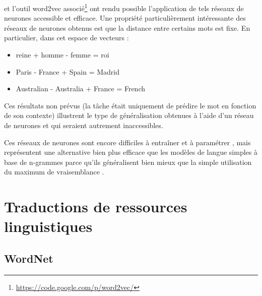 
\cite{mikolov2013efficient} et l'outil word2vec
associé\footnote{\url{https://code.google.com/p/word2vec/}} ont rendu possible
l'application de tels réseaux de neurones accessible et efficace. Une propriété
particulièrement intéressante des réseaux de neurones obtenus est que la
distance entre certains mots est fixe. En particulier, dans cet espace de
vecteurs :

\begin{itemize}
    \item reine + homme - femme = roi
    \item Paris - France + Spain = Madrid
    \item Australian - Australia + France = French
\end{itemize}

Ces résultats non prévus (la tâche était uniquement de prédire le mot en
fonction de son contexte) illustrent le type de généralisation obtenues à
l'aide d'un réseau de neurones et qui seraient autrement inaccessibles.

Ces réseaux de neurones sont encore difficiles à entraîner et à paramétrer
\citep{do2014modeles}, mais représentent une alternative bien plus efficace que
les modèles de langue simples à base de n-grammes parce qu'ils généralisent
bien mieux que la simple utilisation du maximum de vraisemblance
\citep{olah2014deep}.


\section{Traductions de ressources linguistiques}
\label{sec:translation}

\subsection{WordNet}

